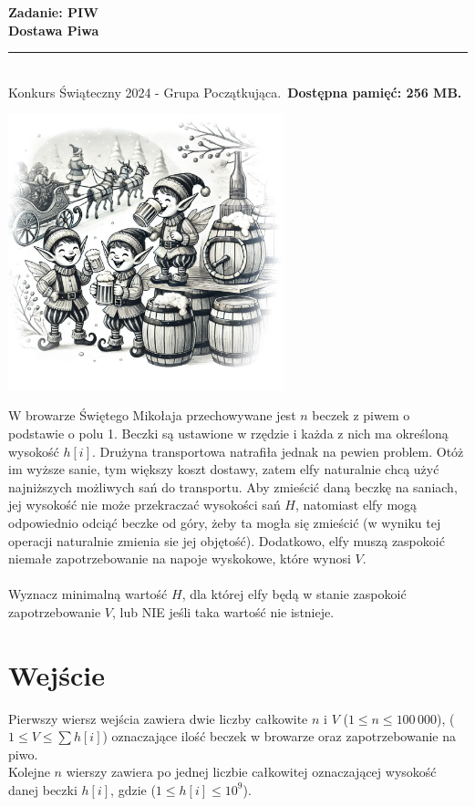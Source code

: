 \documentclass[a4paper,11pt]{article}
\newcommand{\tasktitle}{Dostawa Piwa}
\newcommand{\taskshort}{PIW}
\newcommand{\contestinfo}{Konkurs Świąteczny 2024 - Grupa Początkująca.}
\newcommand{\memorylimit}{256 MB}
\begin{document}
\noindent\textbf{\LARGE Zadanie: \taskshort} \\
\textbf{\Large \tasktitle} \\
\rule{\textwidth}{0.4pt} \\
\small \contestinfo \
\textbf{Dostępna pamięć: \memorylimit.}

\begin{center}
\includegraphics[width=0.6\textwidth]{elfy_zadanie_piwo.jpg} %
\end{center}

\noindent W browarze Świętego Mikołaja przechowywane jest $n$ beczek z piwem o podstawie o polu 1. Beczki są ustawione w rzędzie i każda z nich ma określoną wysokość $h[i]$. Drużyna transportowa natrafiła jednak na pewien problem. Otóż im wyższe sanie, tym większy koszt dostawy, zatem elfy naturalnie chcą użyć najniższych możliwych sań do transportu. Aby zmieścić daną beczkę na saniach, jej wysokość nie może przekraczać wysokości sań $H$, natomiast elfy mogą odpowiednio odciąć beczke od góry, żeby ta mogła się zmieścić (w wyniku tej operacji naturalnie zmienia sie jej objętość). Dodatkowo, elfy muszą zaspokoić niemałe zapotrzebowanie na napoje wyskokowe, które wynosi $V$.\\\\Wyznacz minimalną wartość $H$, dla której elfy będą w stanie zaspokoić zapotrzebowanie $V$, lub NIE jeśli taka wartość nie istnieje.


\section*{Wejście}
Pierwszy wiersz wejścia zawiera dwie liczby całkowite $n$ i $V$ ($1 \leq n \leq 100\,000$), ($1 \leq V \leq \sum h[i]$) oznaczające ilość beczek w browarze oraz zapotrzebowanie na piwo.\\Kolejne $n$ wierszy zawiera po jednej liczbie całkowitej oznaczającej wysokość danej beczki $h[i]$, gdzie ($1 \leq h[i] \leq 10^9$).
\end{document}

